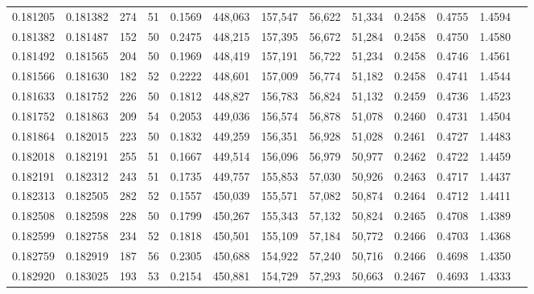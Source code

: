\begin{tabular}{rrrrrrrrrrrrr}
0.181205 & 0.181382 &   274 &  51 &                                     0.1569 & 448,063 & 157,547 &  56,622 &  51,334 & 0.2458 & 0.4755 & 1.4594 \\
0.181382 & 0.181487 &   152 &  50 &                                     0.2475 & 448,215 & 157,395 &  56,672 &  51,284 & 0.2458 & 0.4750 & 1.4580 \\
0.181492 & 0.181565 &   204 &  50 &                                     0.1969 & 448,419 & 157,191 &  56,722 &  51,234 & 0.2458 & 0.4746 & 1.4561 \\
0.181566 & 0.181630 &   182 &  52 &                                     0.2222 & 448,601 & 157,009 &  56,774 &  51,182 & 0.2458 & 0.4741 & 1.4544 \\
0.181633 & 0.181752 &   226 &  50 &                                     0.1812 & 448,827 & 156,783 &  56,824 &  51,132 & 0.2459 & 0.4736 & 1.4523 \\
0.181752 & 0.181863 &   209 &  54 &                                     0.2053 & 449,036 & 156,574 &  56,878 &  51,078 & 0.2460 & 0.4731 & 1.4504 \\
0.181864 & 0.182015 &   223 &  50 &                                     0.1832 & 449,259 & 156,351 &  56,928 &  51,028 & 0.2461 & 0.4727 & 1.4483 \\
0.182018 & 0.182191 &   255 &  51 &                                     0.1667 & 449,514 & 156,096 &  56,979 &  50,977 & 0.2462 & 0.4722 & 1.4459 \\
0.182191 & 0.182312 &   243 &  51 &                                     0.1735 & 449,757 & 155,853 &  57,030 &  50,926 & 0.2463 & 0.4717 & 1.4437 \\
0.182313 & 0.182505 &   282 &  52 &                                     0.1557 & 450,039 & 155,571 &  57,082 &  50,874 & 0.2464 & 0.4712 & 1.4411 \\
0.182508 & 0.182598 &   228 &  50 &                                     0.1799 & 450,267 & 155,343 &  57,132 &  50,824 & 0.2465 & 0.4708 & 1.4389 \\
0.182599 & 0.182758 &   234 &  52 &                                     0.1818 & 450,501 & 155,109 &  57,184 &  50,772 & 0.2466 & 0.4703 & 1.4368 \\
0.182759 & 0.182919 &   187 &  56 &                                     0.2305 & 450,688 & 154,922 &  57,240 &  50,716 & 0.2466 & 0.4698 & 1.4350 \\
0.182920 & 0.183025 &   193 &  53 &                                     0.2154 & 450,881 & 154,729 &  57,293 &  50,663 & 0.2467 & 0.4693 & 1.4333 \\

\end{tabular}
